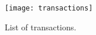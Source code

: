 \begin{figure}[!htbp]
    \centering
    \texttt{[image: transactions]}
    \caption{List of transactions.}
    \label{fig:transactions}
\end{figure}
    